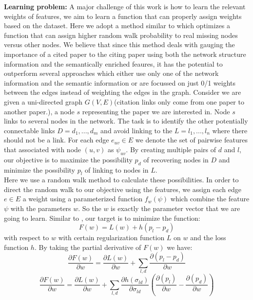 \documentclass{article} %
\begin{document}
\textbf{Learning problem:} A major challenge of this work is how to learn the relevant weights of features, we aim to learn a function that can properly assign weights based on the dataset. Here we adopt a method similar to \cite{Backstrom:2011:SRW:1935826.1935914} which optimizes a function that can assign higher random walk probability to real missing nodes versus other nodes. We believe that since this method deals with gauging the importance of a cited paper to the citing paper using both the network structure information and the semantically enriched feaures, it has the potential to outperform several approaches which either use only one of the network information and the semantic information or are focussed on just 0/1 weights between the edges instead of weighting the edges in the graph. Consider we are given a uni-directed graph $G(V,E)$(citation links only come from one paper to another paper.), a node $s$ representing the paper we are interested in. Node $s$ links to several nodes in the network. The task is to identify the other potentially connectable links $D={d_1,...,d_m}$ and avoid linking to the $L={l_1,...,l_n}$ where there should not be a link. For each edge $e_{uv}\in E$ we denote the set of pairwise features that associated with node $(u,v)$ as $\psi_{uv}$. By creating multiple pairs of $d$ and $l$, our objective is to maximize the possibility $p_d$ of recovering nodes in $D$ and minimize the possibility $p_l$ of linking to nodes in $L$. \\
	Here we use a random walk method to calculate these possibilities. In order to direct the random walk to our objective using the features, we assign each edge $e \in E$ a weight using a parameterized function $f_w(\psi)$ which combine the feature $\psi$ with the parameters $w$. So the $w$ is exactly the parameter vector that we are going to learn. Similar to \cite{Backstrom:2011:SRW:1935826.1935914}, our target is to minimize the function:
\begin{equation}
F(w)=L(w) + h(p_l - p_d)
\end{equation} 
with respect to $w$ with certain regularization function $L$ on $w$ and the loss function $h$. By taking the partial derivative of $F(w)$ we have:
\begin{equation}
\frac{\partial F(w)}{\partial w} = \frac{\partial L(w)}{\partial w} + \sum_{l,d} \frac{\partial(p_l-p_d)}{\partial w}
\end{equation}
\begin{equation}
\frac{\partial F(w)}{\partial w} = \frac{\partial L(w)}{\partial w} + \sum_{l,d} \frac{\partial h(\sigma_{ld})}{\partial \sigma_{ld}}(\frac{\partial(p_l)}{\partial w} - \frac{\partial(p_d)}{\partial w}  )
\end{equation}
\end{document}

